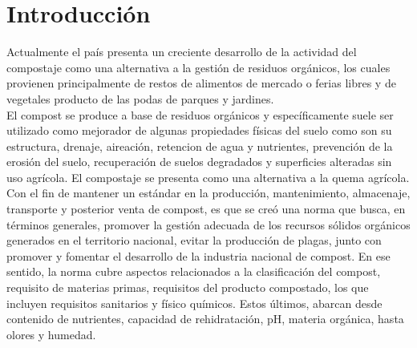 \documentclass[12pt, letterpaper]{article}
\begin{document}
\section{Introducción}
Actualmente el país presenta un creciente desarrollo de la actividad del compostaje como una alternativa a la gestión de residuos orgánicos, los cuales provienen principalmente de restos de alimentos de mercado o ferias libres y de vegetales producto de las podas de parques y jardines. \\
El compost se produce a base de residuos orgánicos y específicamente suele ser utilizado como mejorador de algunas propiedades físicas del suelo como son su estructura, drenaje, aireación, retencion de agua y nutrientes, prevención de la erosión del suelo, recuperación de suelos degradados y superficies alteradas sin uso agrícola. El compostaje se presenta como una alternativa a la quema agrícola.\\
Con el fin de mantener un estándar en la producción, mantenimiento, almacenaje, transporte y posterior venta de compost, es que se creó una norma que busca, en términos generales, promover la gestión adecuada de los recursos sólidos orgánicos generados en el territorio nacional, evitar la producción de plagas, junto con promover y fomentar el desarrollo de la industria nacional de compost. En ese sentido, la norma cubre aspectos relacionados a la clasificación del compost, requisito de materias primas, requisitos del producto compostado, los que incluyen requisitos sanitarios y físico químicos. Estos últimos, abarcan desde contenido de nutrientes, capacidad de rehidratación, pH, materia orgánica, hasta olores y humedad.\\
\end{document}
